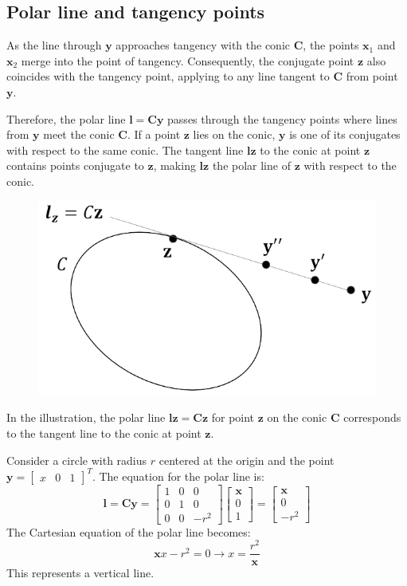 \subsection{Polar line and tangency points}
As the line through $\mathbf{y}$ approaches tangency with the conic $\mathbf{C}$, the points $\mathbf{x}_1$ and $\mathbf{x}_2$ merge into the point of tangency. 
Consequently, the conjugate point $\mathbf{z}$ also coincides with the tangency point, applying to any line tangent to $\mathbf{C}$ from point $\mathbf{y}$.

Therefore, the polar line $\mathbf{l}=\mathbf{Cy}$ passes through the tangency points where lines from $\mathbf{y}$ meet the conic $\mathbf{C}$.
If a point $\mathbf{z}$ lies on the conic, $\mathbf{y}$ is one of its conjugates with respect to the same conic. 
The tangent line $\mathbf{lz}$ to the conic at point $\mathbf{z}$ contains points conjugate to $\mathbf{z}$, making $\mathbf{lz}$ the polar line of $\mathbf{z}$ with respect to the conic.
\begin{figure}[H]
    \centering
    \includegraphics[width=0.4\linewidth]{images/tangentpolar.png}
\end{figure}
In the illustration, the polar line $\mathbf{lz}=\mathbf{Cz}$ for point $\mathbf{z}$ on the conic $\mathbf{C}$ corresponds to the tangent line to the conic at point $\mathbf{z}$.
\begin{example}
    Consider a circle with radius $r$ centered at the origin and the point $\mathbf{y}={\begin{bmatrix} x & 0 & 1 \end{bmatrix}}^T$. 
    The equation for the polar line is:
    \[\mathbf{l}=\mathbf{Cy}=\begin{bmatrix} 1 & 0 & 0 \\ 0 & 1 & 0 \\ 0 & 0 & -r^2 \end{bmatrix} \begin{bmatrix} \mathbf{x} \\ 0 \\ 1 \end{bmatrix} = \begin{bmatrix} \mathbf{x} \\ 0 \\ -r^2 \end{bmatrix}\]
    The Cartesian equation of the polar line becomes:
    \[\mathbf{x} x-r^2 = 0 \rightarrow x=\dfrac{r^2}{\mathbf{x}}\]
    This represents a vertical line.
\end{example}
